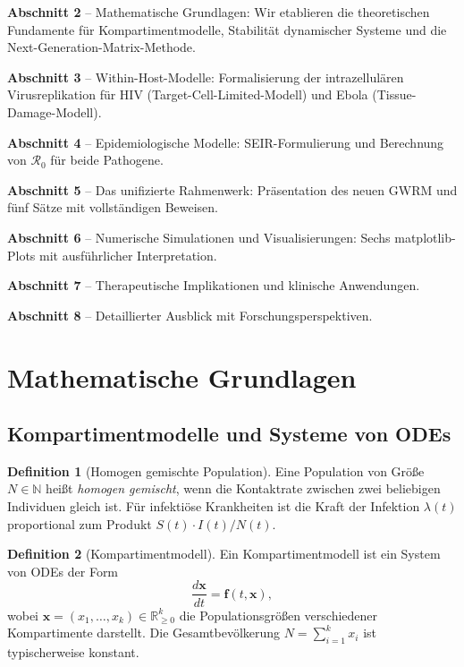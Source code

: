 ﻿\documentclass[a4paper,12pt]{article}
\theoremstyle{definition}
\newtheorem{definition}{Definition}
\begin{document}
\textbf{Abschnitt 2} -- Mathematische Grundlagen: Wir etablieren die theoretischen Fundamente für Kompartimentmodelle, Stabilität dynamischer Systeme und die Next-Generation-Matrix-Methode.

\textbf{Abschnitt 3} -- Within-Host-Modelle: Formalisierung der intrazellulären Virusreplikation für HIV (Target-Cell-Limited-Modell) und Ebola (Tissue-Damage-Modell).

\textbf{Abschnitt 4} -- Epidemiologische Modelle: SEIR-Formulierung und Berechnung von $\mathcal{R}_0$ für beide Pathogene.

\textbf{Abschnitt 5} -- Das unifizierte Rahmenwerk: Präsentation des neuen GWRM und fünf Sätze mit vollständigen Beweisen.

\textbf{Abschnitt 6} -- Numerische Simulationen und Visualisierungen: Sechs matplotlib-Plots mit ausführlicher Interpretation.

\textbf{Abschnitt 7} -- Therapeutische Implikationen und klinische Anwendungen.

\textbf{Abschnitt 8} -- Detaillierter Ausblick mit Forschungsperspektiven.

\section{Mathematische Grundlagen}

\subsection{Kompartimentmodelle und Systeme von ODEs}

\begin{definition}[Homogen gemischte Population]
Eine Population von Größe $N \in \mathbb{N}$ heißt \emph{homogen gemischt}, wenn die Kontaktrate zwischen zwei beliebigen Individuen gleich ist. Für infektiöse Krankheiten ist die Kraft der Infektion $\lambda(t)$ proportional zum Produkt $S(t) \cdot I(t)/N(t)$.
\end{definition}

\begin{definition}[Kompartimentmodell]
Ein Kompartimentmodell ist ein System von ODEs der Form
\[
\frac{d\mathbf{x}}{dt} = \mathbf{f}(t, \mathbf{x}),
\]
wobei $\mathbf{x} = (x_1, \ldots, x_k) \in \mathbb{R}_{\geq 0}^k$ die Populationsgrößen verschiedener Kompartimente darstellt. Die Gesamtbevölkerung $N = \sum_{i=1}^k x_i$ ist typischerweise konstant.
\end{definition}
\end{document}
